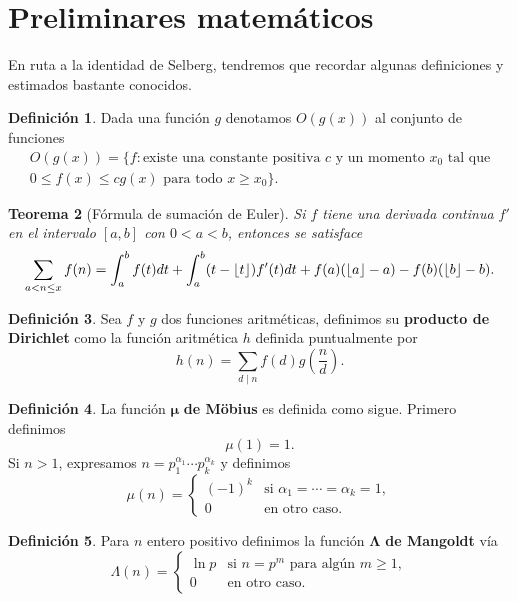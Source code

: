\documentclass[10pt]{article}
\DeclarePairedDelimiter\floor{\lfloor}{\rfloor}
\newtheorem{theorem}{Teorema}
\theoremstyle{definition}
\newtheorem{defn}[theorem]{Definici\'on}
\theoremstyle{remark}
\begin{document}
\section{Preliminares matem\'aticos}

En ruta a la identidad de Selberg, tendremos que recordar algunas definiciones y estimados bastante conocidos.

\begin{defn}
Dada una funci\'on $g$ denotamos $O(g(x))$ al conjunto de funciones
\[
\begin{gathered}
O(g(x)) = \{f : \text{existe una constante positiva } c \text{ y un momento } x_0 \text{ tal que}\\
0 \leq f(x) \leq cg(x) \text{ para todo } x \geq x_0\}.
\end{gathered}
\]
\end{defn}

\begin{theorem}[F\'ormula de sumaci\'on de Euler]
Si $f$ tiene una derivada continua $f'$ en el intervalo $[a, b]$ con $0 < a < b$, 
entonces se satisface 
\[
\sum_{a < n \leq x} f(n) = \int_a^b f(t) dt + \int_a^b (t - \floor{t}) f'(t) dt
+ f(a)(\floor{a} - a) - f(b)(\floor{b} - b).
\]
\end{theorem}

\begin{defn}\label{def03}
Sea $f$ y $g$ dos funciones aritm\'eticas, 
definimos su {\bf producto de Dirichlet} como la funci\'on aritm\'etica $h$ definida puntualmente por 
\[
h(n) = \sum_{d \mid n} f(d) g\left(\frac{n}{d}\right).
\]
\end{defn}

\begin{defn}
La funci\'on $\boldsymbol{\mu}$ \textbf{de M\"{o}bius} es definida como sigue. 
Primero definimos 
\[
\mu(1) = 1.
\]
Si $n > 1$, expresamos $n = p_1^{\alpha_1} \cdots p_k^{\alpha_k}$ y 
definimos 
\[
\mu(n) = 
\begin{cases}
(-1)^k &\text{si } \alpha_1 = \cdots = \alpha_k = 1, \\
0 &\text{en otro caso}. 
\end{cases}
\]
\end{defn}

\begin{defn}
Para $n$ entero positivo definimos la funci\'on $\boldsymbol{\Lambda}$ \textbf{de Mangoldt} v\'ia 
\[
\Lambda(n) =
\begin{cases}
\ln p &\text{si } n = p^m \text{ para alg\'un } m \geq 1,\\
0 &\text{en otro caso.}
\end{cases}
\]
\end{defn}
\end{document}

